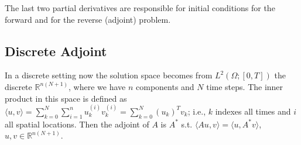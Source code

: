 \documentclass[10pt]{article}
\begin{document}
The last two partial derivatives are responsible for initial conditions for the forward and for the reverse (adjoint) problem.

\subsection{Discrete Adjoint \label{sec:adj:discrete}} 

In a discrete setting now the solution space becomes from $L^2(\Omega;[0,T])$ the discrete $\mathbb{R}^{n(N+1)}$, where we have $n$ components and $N$ time
steps. The inner product in this space is defined as $\langle u , v
\rangle = \sum_{k=0}^N \sum_{i=1}^{n} u_k^{(i)} v_k^{(i)} =
\sum_{k=0}^N  (u_k)^T v_k$; i.e., $k$ indexes all times and $i$ all
spatial locations. Then the adjoint of $A$ is $A^*$ s.t. $\langle A u , v
\rangle = \langle u , A^* v \rangle $, $u,v \in \mathbb{R}^{n(N+1)}$.
\end{document}
